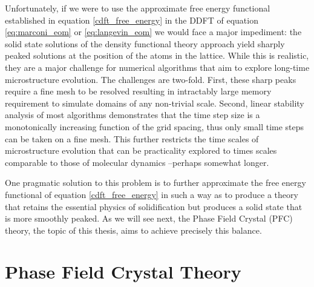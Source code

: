 Unfortunately, if we were to use the approximate free energy functional
established in equation \ref{cdft_free_energy} in the DDFT of equation
\ref{eq:marconi_eom} or \ref{eq:langevin_eom} we would face a major impediment:
the solid state solutions of the density functional theory approach yield
sharply peaked solutions at the position of the atoms in the lattice. While
this is realistic, they are a major challenge for numerical algorithms that aim
to explore long-time microstructure evolution.  The challenges are two-fold.
First, these sharp peaks require a fine mesh to be resolved resulting in
intractably large memory requirement to simulate domains of any non-trivial
scale. Second, linear stability analysis of most algorithms demonstrates that
the time step size is a monotonically increasing function of the grid spacing,
thus only small time steps can be taken on a fine mesh. This further restricts
the time scales of microstructure evolution that can be practicality explored
to times scales comparable to those of molecular dynamics --perhaps somewhat
longer.

One pragmatic solution to this problem is to further approximate the free
energy functional of equation \ref{cdft_free_energy} in such a way as to
produce a theory that retains the essential physics of solidification but
produces a solid state that is more smoothly peaked. As we will see next, the
Phase Field Crystal (PFC) theory, the topic of this thesis, aims to achieve
precisely this balance.

\section{Phase Field Crystal Theory} %


